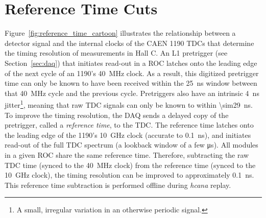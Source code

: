 \section{Reference Time Cuts} \label{sec:reftime}

Figure~\ref{fig:reference_time_cartoon} illustrates the relationship
between a detector signal and the internal clocks of the CAEN 1190 TDCs that
determine the timing resolution of measurements in Hall C.
An L1 pretrigger (see Section~\ref{sec:daq}) that initiates read-out
in a ROC latches onto the leading edge of the next cycle of an 1190's
\SI{40}{\mega\hertz} clock.
As a result, this digitized pretrigger time can only be known to have been
received within the \SI{25}{\nano\second} window between that
\SI{40}{\mega\hertz} cycle and the previous cycle.
Pretriggers also have an intrinsic \SI{4}{\nano\second}
jitter\footnote{A small, irregular variation in an otherwise periodic signal.},
meaning that raw TDC signals can only be known to within
\SI{\sim29}{\nano\second}.
To improve the timing resolution, the DAQ sends a delayed copy of the
pretrigger, called a \textit{reference time}, to the TDC.
The reference time latches onto the leading edge of the 1190's
\SI{10}{\giga\hertz} clock (accurate to \SI{0.1}{\nano\second}), and initiates
read-out of the full TDC spectrum (a lookback window of a few
\si{\micro\second}).
All modules in a given ROC share the same reference time.
Therefore, subtracting the raw TDC time (synced to the \SI{40}{\mega\hertz}
clock) from the reference time (synced to the \SI{10}{\giga\hertz} clock),
the timing resolution can be improved to approximately \SI{0.1}{\nano\second}.
This reference time subtraction is performed offline during \textit{hcana}
replay.


